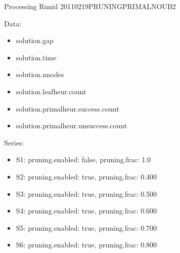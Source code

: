 \documentclass[landscape, 12pt]{report}
\begin{document}
Processing Runid 20110219PRUNINGPRIMALNOUB2

Data:
\begin{itemize}
\item solution.gap
\item solution.time
\item solution.nnodes
\item solution.leafheur.count
\item solution.primalheur.success.count
\item solution.primalheur.unsuccess.count
\end{itemize}
Series:
\begin{itemize}
\item S1: pruning.enabled: false, pruning.frac: 1.0
\item S2: pruning.enabled: true, pruning.frac: 0.400
\item S3: pruning.enabled: true, pruning.frac: 0.500
\item S4: pruning.enabled: true, pruning.frac: 0.600
\item S5: pruning.enabled: true, pruning.frac: 0.700
\item S6: pruning.enabled: true, pruning.frac: 0.800
\end{itemize}
\end{document}
